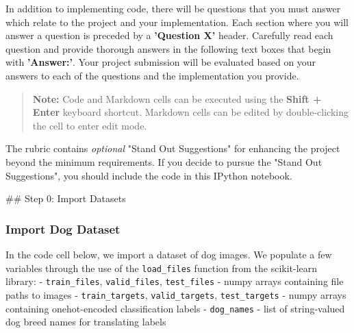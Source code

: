 \documentclass[11pt]{article}
\begin{document}
In addition to implementing code, there will be questions that you must
answer which relate to the project and your implementation. Each section
where you will answer a question is preceded by a \textbf{'Question X'}
header. Carefully read each question and provide thorough answers in the
following text boxes that begin with \textbf{'Answer:'}. Your project
submission will be evaluated based on your answers to each of the
questions and the implementation you provide.

\begin{quote}
\textbf{Note:} Code and Markdown cells can be executed using the
\textbf{Shift + Enter} keyboard shortcut. Markdown cells can be edited
by double-clicking the cell to enter edit mode.
\end{quote}

The rubric contains \emph{optional} "Stand Out Suggestions" for
enhancing the project beyond the minimum requirements. If you decide to
pursue the "Stand Out Suggestions", you should include the code in this
IPython notebook.

 \#\# Step 0: Import Datasets

\subsubsection{Import Dog Dataset}\label{import-dog-dataset}

In the code cell below, we import a dataset of dog images. We populate a
few variables through the use of the \texttt{load\_files} function from
the scikit-learn library: - \texttt{train\_files},
\texttt{valid\_files}, \texttt{test\_files} - numpy arrays containing
file paths to images - \texttt{train\_targets}, \texttt{valid\_targets},
\texttt{test\_targets} - numpy arrays containing onehot-encoded
classification labels - \texttt{dog\_names} - list of string-valued dog
breed names for translating labels
\end{document}
